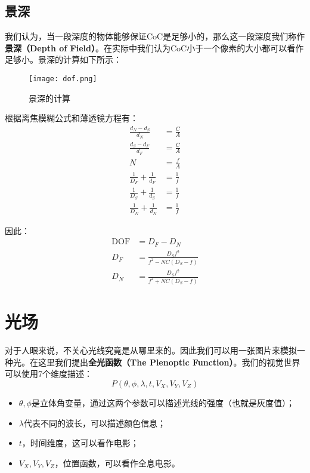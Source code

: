 \documentclass[openany]{progbookcn}
\begin{document}
\subsection{景深}

	我们认为，当一段深度的物体能够保证CoC是足够小的，那么这一段深度我们称作\textbf{景深（Depth of Field）}。在实际中我们认为CoC小于一个像素的大小都可以看作足够小。景深的计算如下所示：
	
		\begin{figure}[H]
		\centering
		\texttt{[image: dof.png]}
		\caption{景深的计算}
		\label{fig:dof}
	\end{figure}

根据离焦模糊公式和薄透镜方程有：
\begin{equation}
	\begin{split}
		\frac{d_{N}-d_{S}}{d_{N}} &=\frac{C}{A} \\
		\frac{d_{S}-d_{F}}{d_{F}} &=\frac{C}{A} \\
		N &=\frac{f}{A} \\
		\frac{1}{D_{F}}+\frac{1}{d_{F}} &=\frac{1}{f} \\
		\frac{1}{D_{S}}+\frac{1}{d_{S}} &=\frac{1}{f} \\
		\frac{1}{D_{N}}+\frac{1}{d_{N}} &=\frac{1}{f}
	\end{split}
\end{equation}

因此：
\begin{equation}
	\begin{split}
		\mathrm{DOF}&=D_{F}-D_{N} \\
		D_{F}&=\frac{D_{S} f^{2}}{f^{2}-N C\left(D_{S}-f\right)}\\
		D_{N}&=\frac{D_{S} f^{2}}{f^{2}+N C\left(D_{S}-f\right)}
	\end{split}
\end{equation}

\section{光场}

对于人眼来说，不关心光线究竟是从哪里来的。因此我们可以用一张图片来模拟一种光。在这里我们提出\textbf{全光函数（The Plenoptic Function）}。我们的视觉世界可以使用7个维度描述：
\begin{equation}
	P(\theta,\phi,\lambda,t,V_X,V_Y,V_Z)
\end{equation}

\begin{itemize}
	\item $\theta,\phi$是立体角变量，通过这两个参数可以描述光线的强度（也就是灰度值）；
	\item $\lambda$代表不同的波长，可以描述颜色信息；
	\item $t$，时间维度，这可以看作电影；
	\item $V_X,V_Y,V_Z$，位置函数，可以看作全息电影。
\end{itemize}
\end{document}
